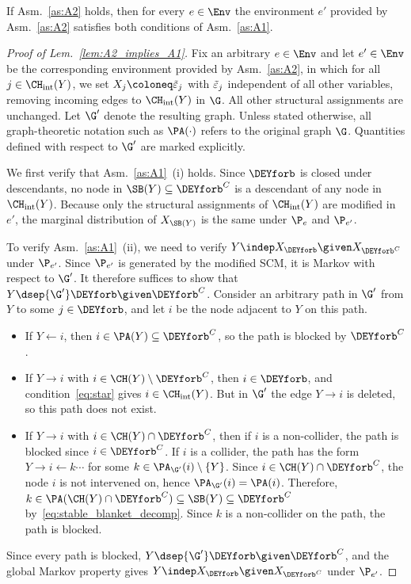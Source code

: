 \begin{lemma}
\label{lem:A2_implies_A1}
If Asm.~\ref{as:A2} holds, then for every $e \in \Env$ the
environment $e'$ provided by Asm.~\ref{as:A2} satisfies both
conditions of Asm.~\ref{as:A1}.
\end{lemma}
\begin{proof}[Proof of Lem.~\ref{lem:A2_implies_A1}]
Fix an arbitrary $e \in \Env$ and let $e' \in \Env$ be the corresponding environment provided by
Asm.~\ref{as:A2}, in which for all
$j \in \CH_\mathrm{int}(Y)$, we set $X_j \coloneq \Tilde{\varepsilon}_j$ with $\Tilde{\varepsilon}_j$ independent of all other variables, removing incoming edges to $\CH_\mathrm{int}(Y)$ in $\G$. All other structural assignments are unchanged. Let $\G'$ denote the resulting graph. Unless stated otherwise, all graph-theoretic notation such as $\PA(\cdot)$ refers to the original graph $\G$. Quantities defined with respect to $\G'$ are marked explicitly.

We first verify that Asm.~\ref{as:A1}~(i) holds.
Since $\DEYforb$ is closed under descendants, no node in
$\SB(Y) \subseteq \DEYforb^C$ is a descendant of any node in
$\CH_\mathrm{int}(Y)$. Because only the structural assignments of
$\CH_\mathrm{int}(Y)$ are modified in $e'$, the marginal distribution of
$X_{\SB(Y)}$ is the same under $\P_e$ and $\P_{e'}$.

To verify Asm.~\ref{as:A1}~(ii), we need to verify $Y \indep X_{\DEYforb} \given X_{\DEYforb^C}$ under $\P_{e'}$. Since $\P_{e'}$ is generated by the
modified SCM, it is Markov with respect to $\G'$. It therefore suffices
to show that $Y \dsep{\G'} \DEYforb \given \DEYforb^C$. Consider an arbitrary path in $\G'$ from $Y$ to some $j \in \DEYforb$, and let
$i$ be the node adjacent to $Y$ on this path.
\begin{itemize}
    \item If $Y \leftarrow i$, then $i \in \PA(Y) \subseteq \DEYforb^C$, so the path is blocked by $\DEYforb^C$.
    \item If $Y \to i$ with $i \in \CH(Y) \setminus \DEYforb^C$, then
    $i \in \DEYforb$, and
    condition~\eqref{eq:star} gives
    $i \in \CH_\mathrm{int}(Y)$. But in $\G'$ the edge $Y \to i$ is
    deleted, so this path does not exist.
    \item If $Y \to i$ with $i \in \CH(Y) \cap \DEYforb^C$, then if $i$ is a
    non-collider, the path is blocked since $i \in \DEYforb^C$. If
    $i$ is a collider, the path has the form
    $Y \to i \leftarrow k \cdots $ for some
    $k \in \PA_{\G'}(i) \setminus \{Y\}$. Since $i \in \CH(Y) \cap \DEYforb^C$, the node $i$ is not intervened on, hence $\PA_{\G'}(i) = \PA(i)$. Therefore,  
    $k \in \PA(\CH(Y) \cap \DEYforb^C) \subseteq \SB(Y)
    \subseteq \DEYforb^C$
    by~\eqref{eq:stable_blanket_decomp}. Since $k$ is a non-collider
    on the path, the path is blocked.
\end{itemize}
Since every path is blocked,
$Y \dsep{\G'} \DEYforb \given \DEYforb^C$, and the global Markov
property gives
$Y \indep X_{\DEYforb} \given X_{\DEYforb^C}$ under $\P_{e'}$.
\end{proof}



